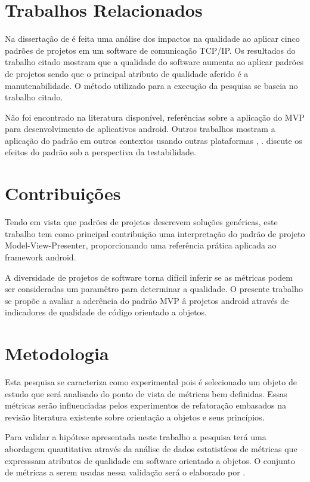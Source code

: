 \section{Trabalhos Relacionados}

Na dissertação de  é feita uma análise dos impactos na
qualidade ao aplicar cinco padrões de projetos em um software de comunicação
TCP/IP. Os resultados do trabalho citado mostram que a qualidade do software
aumenta ao aplicar padrões de projetos sendo que o principal atributo de
qualidade aferido é a manutenabilidade. O método utilizado para a execução da
pesquisa se baseia no trabalho citado. 

Não foi encontrado na literatura disponível, referências sobre a aplicação do
MVP para desenvolvimento de aplicativos android. Outros trabalhos mostram a
aplicação do padrão em outros contextos usando outras plataformas 
\cite{presenterfirst}, \cite{yangmvp}.  discute os
efeitos do padrão sob a perspectiva da testabilidade.

\section{Contribuições}


Tendo em vista que padrões de projetos descrevem soluções genéricas, este
trabalho tem como principal contribuição uma interpretação do padrão de projeto
Model-View-Presenter, proporcionando uma referência prática aplicada ao
framework android.

A diversidade de projetos de software torna difícil inferir se as métricas
podem ser consideradas um paramêtro para determinar a qualidade. O presente
trabalho  se propõe a avaliar a aderência do padrão MVP â projetos android
através de indicadores de qualidade de código orientado a objetos.

\section{Metodologia}

Esta pesquisa se caracteriza como experimental pois é selecionado um objeto
de estudo que será analisado do ponto de vista de métricas bem definidas. Essas
métricas serão influenciadas pelos experimentos de refatoração embasados na
revisão literatura existente sobre orientação a objetos e seus princípios.

Para validar a hipótese apresentada neste trabalho a pesquisa terá uma
abordagem quantitativa através da análise de dados estatistícos de métricas 
que expresssam atributos de qualidade em software orientado a objetos. O
conjunto de métricas a serem usadas nessa validação será o elaborado por
.

